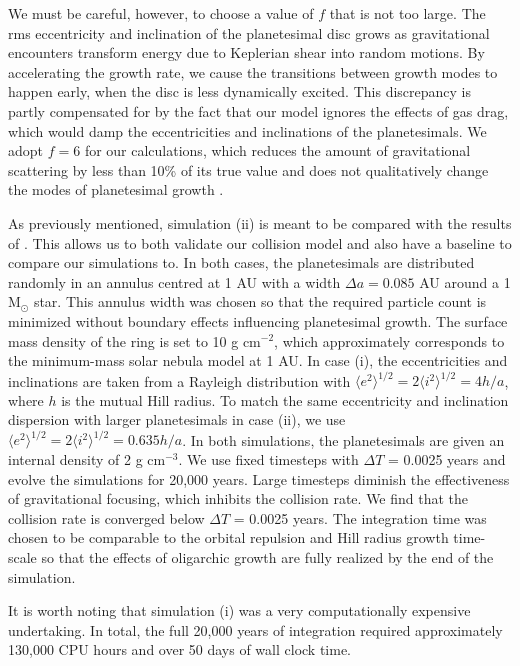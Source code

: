 We must be careful, however, to choose a value of $f$ that is not too large. The rms eccentricity and inclination of the 
planetesimal disc grows as gravitational encounters transform energy due to Keplerian shear into random motions. By 
accelerating the growth rate, we cause the transitions between growth modes to happen early, when the disc is less dynamically 
excited. This discrepancy is partly compensated for by the fact that our model ignores the effects of gas drag, which would damp 
the eccentricities and inclinations of the planetesimals. We adopt $f=6$ for our calculations, which reduces the amount of 
gravitational scattering by less than 10\% of its true value and does not qualitatively change the modes of planetesimal growth 
\cite{kokubo98}.

\noindent As previously mentioned, simulation (ii) is meant to be compared with the results of \cite{kokubo98}. This allows us to 
both validate our collision model and also have a baseline to compare our simulations to. In both cases, the planetesimals are 
distributed randomly in an annulus centred at 1 AU with a width $\Delta a = 0.085$ AU around a 1 $\mathrm{M_{\odot}}$ star. 
This annulus width was chosen so that the required particle count is minimized without boundary effects influencing planetesimal 
growth. The surface mass density of the ring is set to 10 g cm$^{-2}$, which approximately corresponds to the minimum-mass 
solar nebula model \cite{hayashi81} at 1 AU. In case (i), the eccentricities and inclinations are taken from a Rayleigh distribution 
\cite{ida92} with $\langle e^2 \rangle^{1/2} = 2 \langle i^2 \rangle^{1/2} = 4 h/a$, where $h$ is the mutual Hill radius. To match 
the same eccentricity and inclination dispersion with larger planetesimals in case (ii), we use $\langle e^2 \rangle^{1/2} = 2 
\langle i^2 \rangle^{1/2} = 0.635 h/a$. In both simulations, the planetesimals are given an internal density of 2 g cm$^{-3}$. We 
use fixed timesteps with $\Delta T$ = 0.0025 years and evolve the simulations for 20,000 years. Large timesteps diminish the 
effectiveness of gravitational focusing, which inhibits the collision rate. We find that the collision rate is converged below $\Delta 
T$ = 0.0025 years. The integration time was chosen to be comparable to the orbital repulsion and Hill radius growth time-scale 
\cite{kokubo95} so that the effects of oligarchic growth are fully realized by the end of the simulation.

It is worth noting that simulation (i) was a very computationally expensive undertaking. In total, the full 20,000 years of 
integration required approximately 130,000 CPU hours and over 50 days of wall clock time.

